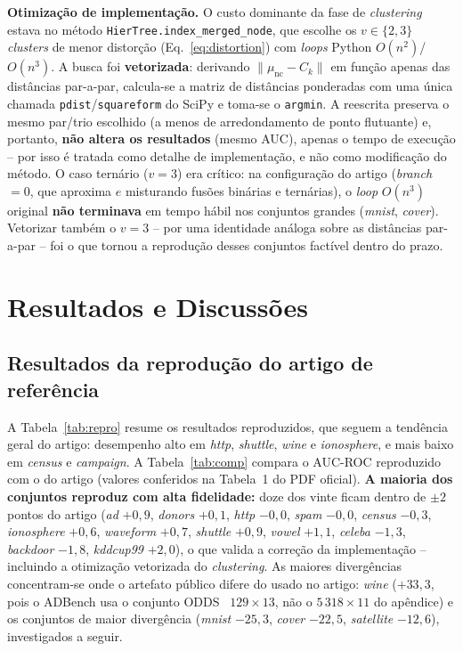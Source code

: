 \documentclass[conference]{IEEEtran}
\begin{document}
\textbf{Otimiza\c{c}\~ao de implementa\c{c}\~ao.} O custo dominante da fase de
\emph{clustering} estava no m\'etodo \texttt{HierTree.index\_merged\_node}, que
escolhe os $v\in\{2,3\}$ \emph{clusters} de menor distor\c{c}\~ao
(Eq.~\ref{eq:distortion}) com \emph{loops} Python $O(n^2)$/$O(n^3)$. A busca foi
\textbf{vetorizada}: derivando $\lVert \mu_{\text{nc}} - C_k\rVert$ em
fun\c{c}\~ao apenas das dist\^ancias par-a-par, calcula-se a matriz de dist\^ancias
ponderadas com uma \'unica chamada \texttt{pdist}/\texttt{squareform} do SciPy e
toma-se o \texttt{argmin}. A reescrita preserva o mesmo par/trio escolhido (a menos de
arredondamento de ponto flutuante) e, portanto, \textbf{n\~ao altera os resultados}
(mesmo AUC), apenas o tempo de execu\c{c}\~ao -- por isso \'e tratada como detalhe de
implementa\c{c}\~ao, e n\~ao como modifica\c{c}\~ao do m\'etodo. O caso tern\'ario
($v=3$) era cr\'itico: na configura\c{c}\~ao do artigo (\emph{branch}~$=0$, que aproxima
$e$ misturando fus\~oes bin\'arias e tern\'arias), o \emph{loop} $O(n^3)$ original
\textbf{n\~ao terminava} em tempo h\'abil nos conjuntos grandes (\emph{mnist},
\emph{cover}). Vetorizar tamb\'em o $v=3$ -- por uma identidade an\'aloga sobre as
dist\^ancias par-a-par -- foi o que tornou a reprodu\c{c}\~ao desses conjuntos
fact\'ivel dentro do prazo.

\section{Resultados e Discuss\~oes}

\subsection{Resultados da reprodu\c{c}\~ao do artigo de refer\^encia}
A Tabela~\ref{tab:repro} resume os resultados reproduzidos, que seguem a
tend\^encia geral do artigo: desempenho alto em \emph{http}, \emph{shuttle},
\emph{wine} e \emph{ionosphere}, e mais baixo em \emph{census} e \emph{campaign}.
A Tabela~\ref{tab:comp} compara o AUC-ROC reproduzido com o do artigo (valores
conferidos na Tabela~1 do PDF oficial). \textbf{A maioria dos conjuntos reproduz com
alta fidelidade:} doze dos vinte ficam dentro de $\pm 2$ pontos do artigo
(\emph{ad} $+0{,}9$, \emph{donors} $+0{,}1$, \emph{http} $-0{,}0$, \emph{spam}
$-0{,}0$, \emph{census} $-0{,}3$, \emph{ionosphere} $+0{,}6$, \emph{waveform}
$+0{,}7$, \emph{shuttle} $+0{,}9$, \emph{vowel} $+1{,}1$, \emph{celeba} $-1{,}3$,
\emph{backdoor} $-1{,}8$, \emph{kddcup99} $+2{,}0$), o que valida a corre\c{c}\~ao da
implementa\c{c}\~ao -- incluindo a otimiza\c{c}\~ao vetorizada do \emph{clustering}.
As maiores diverg\^encias concentram-se onde o artefato p\'ublico difere do usado no
artigo: \emph{wine} ($+33{,}3$, pois o ADBench usa o conjunto ODDS~\cite{odds}
$129\times13$, n\~ao o $5\,318\times11$ do ap\^endice) e os conjuntos de maior
diverg\^encia (\emph{mnist} $-25{,}3$, \emph{cover} $-22{,}5$, \emph{satellite}
$-12{,}6$), investigados a seguir.
\end{document}
